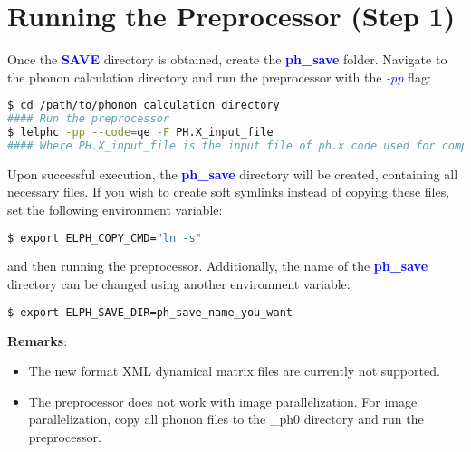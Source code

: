 \documentclass[12pt,twoside,openany]{book}
\begin{document}
\section{Running the Preprocessor (Step 1)}
Once the \textcolor{blue}{\bf{SAVE}} directory is obtained, create the \textcolor{blue}{\bf{ph\_save}} folder. Navigate to the phonon calculation directory and run the preprocessor with the \textcolor{blue}{\emph{-pp}} flag:
\begin{lstlisting}[language=bash]
$ cd /path/to/phonon calculation directory
#### Run the preprocessor
$ lelphc -pp --code=qe -F PH.X_input_file
#### Where PH.X_input_file is the input file of ph.x code used for computing phonons
\end{lstlisting}
Upon successful execution, the \textcolor{blue}{\bf{ph\_save}} directory will be created, containing all necessary files.
If you wish to create soft symlinks instead of copying these files, set the following environment variable:
\begin{lstlisting}[language=bash]
$ export ELPH_COPY_CMD="ln -s"
\end{lstlisting}
and then running the preprocessor.
Additionally, the name of the \textcolor{blue}{\bf{ph\_save}} directory can be changed using another environment variable:
\begin{lstlisting}[language=bash]
$ export ELPH_SAVE_DIR=ph_save_name_you_want
\end{lstlisting}
\textbf{Remarks}:
\begin{itemize}
\item The new format XML dynamical matrix files are currently not supported.
\item The preprocessor does not work with image parallelization. For image parallelization, copy all phonon files to the \_ph0 directory 
and run the preprocessor.
\end{itemize}
\end{document}
